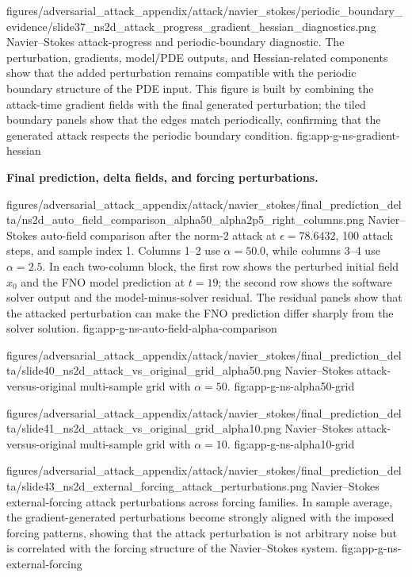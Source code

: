 \documentclass[letterpaper]{article} %
\begin{document}
\appendixattackfig
  {figures/adversarial_attack_appendix/attack/navier_stokes/periodic_boundary_evidence/slide37_ns2d_attack_progress_gradient_hessian_diagnostics.png}
  {Navier--Stokes attack-progress and periodic-boundary diagnostic. The
  perturbation, gradients, model/PDE outputs, and Hessian-related components
  show that the added perturbation remains compatible with the periodic boundary
  structure of the PDE input. This figure is built by combining the attack-time
  gradient fields with the final generated perturbation; the tiled boundary
  panels show that the edges match periodically, confirming that the generated
  attack respects the periodic boundary condition.}
  {fig:app-g-ns-gradient-hessian}

\noindent\textbf{Final prediction, delta fields, and forcing perturbations.}

\appendixattackfig
  {figures/adversarial_attack_appendix/attack/navier_stokes/final_prediction_delta/ns2d_auto_field_comparison_alpha50_alpha2p5_right_columns.png}
  {Navier--Stokes auto-field comparison after the norm-$2$ attack at
  $\epsilon=78.6432$, 100 attack steps, and sample index 1. Columns 1--2 use
  $\alpha=50.0$, while columns 3--4 use $\alpha=2.5$. In each two-column block,
  the first row shows the perturbed initial field $x_0$ and the FNO model
  prediction at $t=19$; the second row shows the software solver output and the
  model-minus-solver residual. The residual panels show that the attacked
  perturbation can make the FNO prediction differ sharply from the solver
  solution.}
  {fig:app-g-ns-auto-field-alpha-comparison}

\appendixattackfig
  {figures/adversarial_attack_appendix/attack/navier_stokes/final_prediction_delta/slide40_ns2d_attack_vs_original_grid_alpha50.png}
  {Navier--Stokes attack-versus-original multi-sample grid with $\alpha=50$.}
  {fig:app-g-ns-alpha50-grid}

\appendixattackfig
  {figures/adversarial_attack_appendix/attack/navier_stokes/final_prediction_delta/slide41_ns2d_attack_vs_original_grid_alpha10.png}
  {Navier--Stokes attack-versus-original multi-sample grid with $\alpha=10$.}
  {fig:app-g-ns-alpha10-grid}

\appendixattackfigfullwidth
  {figures/adversarial_attack_appendix/attack/navier_stokes/final_prediction_delta/slide43_ns2d_external_forcing_attack_perturbations.png}
  {Navier--Stokes external-forcing attack perturbations across forcing
  families. In sample average, the gradient-generated perturbations become
  strongly aligned with the imposed forcing patterns, showing that the attack
  perturbation is not arbitrary noise but is correlated with the forcing
  structure of the Navier--Stokes system.}
  {fig:app-g-ns-external-forcing}
\end{document}
